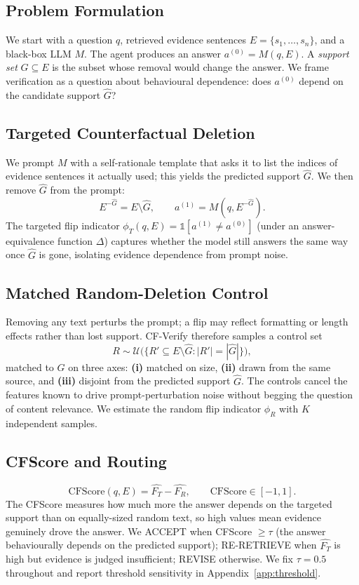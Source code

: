 \documentclass[11pt]{article}
\begin{document}
\subsection{Problem Formulation}
We start with a question $q$, retrieved evidence sentences $E=\{s_1,\dots,s_n\}$, and a black-box LLM $M$. The agent produces an answer $a^{(0)} = M(q, E)$. A \emph{support set} $G \subseteq E$ is the subset whose removal would change the answer. We frame verification as a question about behavioural dependence: does $a^{(0)}$ depend on the candidate support $\hat{G}$?

\subsection{Targeted Counterfactual Deletion}
We prompt $M$ with a self-rationale template that asks it to list the indices of evidence sentences it actually used; this yields the predicted support $\hat{G}$. We then remove $\hat{G}$ from the prompt:
\begin{equation}
E^{-\hat{G}} = E \setminus \hat{G}, \qquad a^{(1)} = M(q, E^{-\hat{G}}).
\end{equation}
The targeted flip indicator $\phi_T(q,E) = \mathbb{1}[a^{(1)} \neq a^{(0)}]$ (under an answer-equivalence function $\Delta$) captures whether the model still answers the same way once $\hat{G}$ is gone, isolating evidence dependence from prompt noise.

\subsection{Matched Random-Deletion Control}
Removing any text perturbs the prompt; a flip may reflect formatting or length effects rather than lost support. CF-Verify therefore samples a control set
\begin{equation}
R \sim \mathcal{U}\big(\{R' \subseteq E\setminus\hat{G} : |R'| = |\hat{G}|\}\big),
\end{equation}
matched to $\hat{G}$ on three axes: \textbf{(i)} matched on size, \textbf{(ii)} drawn from the same source, and \textbf{(iii)} disjoint from the predicted support $\hat{G}$. The controls cancel the features known to drive prompt-perturbation noise without begging the question of content relevance. We estimate the random flip indicator $\phi_R$ with $K$ independent samples.

\subsection{CFScore and Routing}
\begin{equation}
\mathrm{CFScore}(q,E) = \widehat{F_T} - \widehat{F_R}, \qquad \mathrm{CFScore} \in [-1,1].
\end{equation}
The CFScore measures how much more the answer depends on the targeted support than on equally-sized random text, so high values mean evidence genuinely drove the answer. We ACCEPT when CFScore $\geq \tau$ (the answer behaviourally depends on the predicted support); RE-RETRIEVE when $\widehat{F_T}$ is high but evidence is judged insufficient; REVISE otherwise. We fix $\tau = 0.5$ throughout and report threshold sensitivity in Appendix~\ref{app:threshold}.
\end{document}
